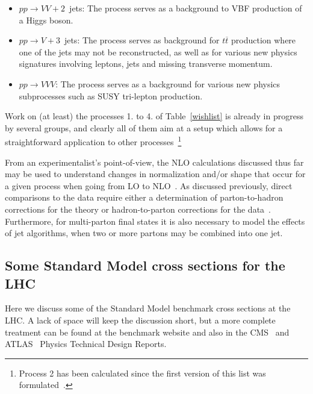 \documentclass[12pt]{iopart}
\begin{document}
\begin{itemize}
\item $pp \rightarrow VV + 2$~jets: The process serves as a background to VBF
production of a Higgs boson.

\item $pp \rightarrow V + 3$~jets: The process serves as background for
$t\overline{t}$ production where one of the jets may not be reconstructed, as well
as for various new physics signatures involving leptons, jets and missing
transverse momentum.

\item $pp \rightarrow VVV$: The process serves as a background for various new
physics subprocesses such as SUSY tri-lepton production.

\end{itemize}
Work on (at least) the processes 1. to 4. of Table~\ref{wishlist} is already
in progress by several groups, and clearly all of them 
aim at a setup which allows for a straightforward 
application to other processes~\footnote{Process 2 has been calculated since the first version of this list
was formulated~\cite{Campbell:2006xx}.}


From an experimentalist's point-of-view, the NLO calculations discussed thus far may be used to understand changes in
normalization and/or shape that occur  for a given process when going from LO to NLO~\cite{Campbell:2004sp}.  As discussed
previously, direct comparisons to the data require either a determination of parton-to-hadron corrections for the theory or
hadron-to-parton corrections for the data~\cite{Flanagan:2005xv}. Furthermore, for multi-parton final states it is also
necessary to model the effects of jet algorithms, when two or more partons may be combined into one jet. 

\subsection{Some Standard Model cross sections for the LHC}
\label{sec:SMLHC}

Here we discuss some of the Standard Model benchmark cross sections at the LHC. A lack of space will keep the
discussion short, but a more complete treatment can be found at the benchmark website and also in the CMS~\cite{CMS_tdr} and ATLAS~\cite{ATLAS_tdr} Physics Technical Design Reports.
\end{document}
